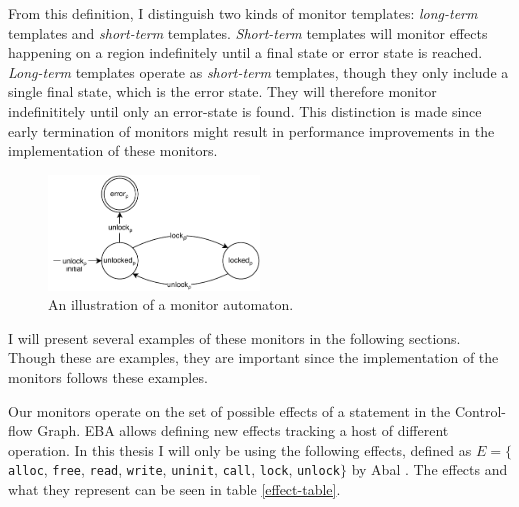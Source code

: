 \newpar From this definition, I distinguish two kinds of monitor templates: \textit{long-term} templates and \textit{short-term} templates. \textit{Short-term} templates will monitor effects happening on a region indefinitely until a final state or error state is reached. \textit{Long-term} templates operate as \textit{short-term} templates, though they only include a single final state, which is the error state. They will therefore monitor indefinititely until only an error-state is found. This distinction is made since early termination of monitors might result in performance improvements in the implementation of these monitors. 

\begin{figure}[H]
    \centering
    \includegraphics[width=0.5\textwidth]{algorithm/figures/double-unlock}
    \caption{An illustration of a monitor automaton.}
    \label{double-unlock-automata-intro}
\end{figure}

\newpar I will present several examples of these monitors in the following sections. Though these are examples, they are important since the implementation of the monitors follows these examples. 

\newpar Our monitors operate on the set of possible effects of a statement in the Control-flow Graph. EBA allows defining new effects tracking a host of different operation. In this thesis I will only be using the following effects, defined as $E = \{$\texttt{alloc}, \texttt{free}, \texttt{read}, \texttt{write}, \texttt{uninit}, \texttt{call}, \texttt{lock}, \texttt{unlock}$\}$ by Abal \cite{EffectiveBugFinding}. The effects and what they represent can be seen in table \ref{effect-table}.

